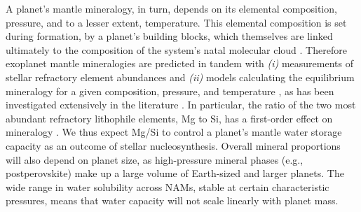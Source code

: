 A planet's mantle mineralogy, in turn, depends on its elemental composition, pressure, and to a lesser extent, temperature. This elemental composition is set during formation, by a planet's building blocks, which themselves are linked ultimately to the composition of the system's natal molecular cloud \citep{anders_solarsystem_1982, thiabaud_elemental_2015, bonsor_hoststar_2021}. Therefore exoplanet mantle mineralogies are predicted in tandem with \textit{(i)} measurements of stellar refractory element abundances and \textit{(ii)} models calculating the equilibrium mineralogy for a given composition, pressure, and temperature \citep[e.g.,][]{connolly_geodynamic_2009}, as has been investigated extensively in the literature \citep{dorn_can_2015, dorn_bayesian_2017, dorn_generalized_2017, dorn_new_2019, unterborn_effects_2017, unterborn_nominal_2023, hinkel_star_2018, otegi_impact_2020, spaargaren_influence_2020, spaargaren_plausible_2022, wang_detailed_2022}. In particular, the ratio of the two most abundant refractory lithophile elements, Mg to Si, has a first-order effect on mineralogy \citep[e.g.,][]{dorn_bayesian_2017, unterborn_effects_2017, hinkel_star_2018, wang_enhanced_2019, spaargaren_influence_2020, spaargaren_plausible_2022}. We thus expect Mg/Si to control a planet's mantle water storage capacity as an outcome of stellar nucleosynthesis. Overall mineral proportions will also depend on planet size, as high-pressure mineral phases (e.g., postperovskite) make up a large volume of Earth-sized and larger planets. The wide range in water solubility across NAMs, stable at certain characteristic pressures, means that water capacity will not scale linearly with planet mass.

